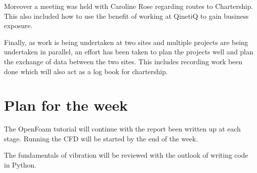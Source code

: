 \documentclass{article}
\begin{document}
	Moreover a meeting was held with Caroline Rose regarding routes to Chartership. This also included how to use the benefit of working at QinetiQ to gain business exposure. 
	
	Finally, as work is being undertaken at two sites and multiple projects are being undertaken in parallel, an effort has been taken to plan the projects well and plan the exchange of data between the two sites. This includes recording work been done which will also act as a log book for chartership.
	
	\section{Plan for the week}
	
	The OpenFoam tutorial will continue with the report been written up at each stage. Running the CFD will be started by the end of the week.
	
	The fundamentals of vibration will be reviewed with the outlook of writing code in Python. 
	
\end{document}
